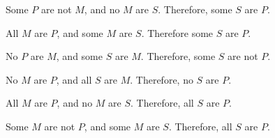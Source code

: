 \begin{exercises}

\item Some $P$ are not $M$, and no $M$ are $S$. Therefore, some $S$ are $P$.

\item All $M$ are $P$, and some $M$ are $S$. Therefore some $S$ are $P$. 

\item No $P$ are $M$, and some $S$ are $M$. Therefore, some $S$ are not $P$.
      
\item No $M$ are $P$, and all $S$ are $M$. Therefore, no $S$ are $P$.
\item All $M$ are $P$, and no $M$ are $S$. Therefore, all $S$ are $P$.
\item Some $M$ are not $P$, and some $M$ are $S$. Therefore, all $S$ are $P$.
\answer{\\
\begin{venns}
\drawsubsyl
\drawmidsyl
\drawpredsyl
\someexisttwofive
\someexistonefour
\end{venns}
\\

}
\end{exercises}
